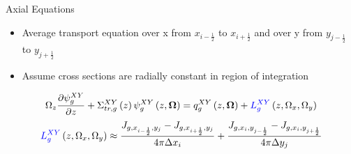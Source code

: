 \begin{frame}[t]{Axial Equations}

\begin{itemize}
  \item Average transport equation over x from $x_{i-\frac{1}{2}}$ to 
  $x_{i+\frac{1}{2}}$ and over y from $y_{j-\frac{1}{2}}$ to $y_{j+\frac{1}{2}}$
  \item Assume cross sections are radially constant in region of integration
\end{itemize}
\begin{dmath*}
{\Omega_z \frac{\partial \psi_{g}^{XY}}{\partial z}} + 
{\Sigma_{tr,g}^{XY}\left(z\right)\psi_{g}^{XY}\left(z,\bm\Omega\right)} = 
q_{g}^{XY}\left(z,\bm\Omega\right) + 
{\textcolor{blue}{L_{g}^{XY}}\left(z,\Omega_x,\Omega_y\right)}
\end{dmath*}
\begin{equation*}
\textcolor{blue}{L_{g}^{XY}}\left(z,\Omega_x,\Omega_y\right) \approx 
{\frac{J_{g,x_{i-\frac{1}{2}},y_j} - 
  J_{g,x_{i+\frac{1}{2}},y_j}}{4\pi\Delta x_i}} +
\frac{J_{g,x_i,y_{j-\frac{1}{2}}} - J_{g,x_i,y_{j+\frac{1}{2}}}}{4\pi\Delta 
y_j}
\end{equation*}

\end{frame}


